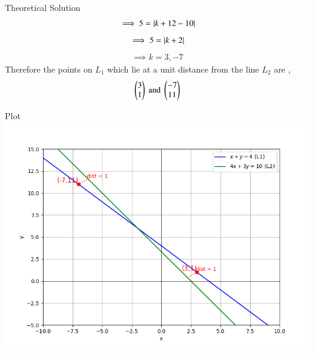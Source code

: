 \documentclass{beamer}
\begin{document}
\begin{frame}{Theoretical Solution}
\begin{align}
    \implies 5 = \left\vert k + 12 - 10\right\vert
\end{align}
\begin{align}
    \implies 5 = \left\vert k + 2\right\vert
\end{align}
\begin{align}
    \implies k = 3, -7
\end{align}
Therefore the points on $L_1$ which lie at a unit distance from the line $L_2$ are ,
\begin{align*}
    \begin{pmatrix}3\\1\end{pmatrix} \ \text{and} \ \begin{pmatrix}-7\\11\end{pmatrix}
\end{align*}

\end{frame}

\begin{frame}{Plot}
    \centering
    \includegraphics[width=\columnwidth, height=0.8\textheight, keepaspectratio]{figs/fig.png}     
\end{frame}
\end{document}
